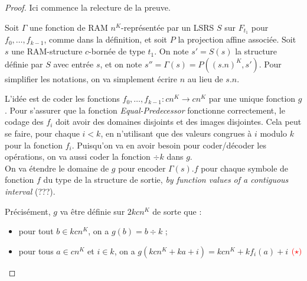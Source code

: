 \documentclass{report}
\begin{document}
		\begin{proof}
			Ici commence la relecture de la preuve.
			
			Soit $\Gamma$ une fonction de RAM $n^K$-représentée par un LSRS $S$ sur $F_{t_1}$ pour $f_0, \dots, f_{k-1}$, comme dans la définition, et soit $P$ la projection affine associée. Soit $s$ une RAM-structure $c$-bornée de type $t_1$. On note $s' = S(s)$ la structure définie par $S$ avec entrée $s$, et on note $s'' = \Gamma(s) = P\left( (s.n)^K, s'\right)$. Pour simplifier les notations, on va simplement écrire $n$ au lieu de $s.n$.
			
			L'idée est de coder les fonctions $f_0, \dots, f_{k-1} : cn^K \to cn^K$ par une unique fonction $g$. Pour s'assurer que la fonction \emph{Equal-Predecessor} fonctionne correctement, le codage des $f_i$ doit avoir des domaines disjoints et des images disjointes. Cela peut se faire, pour chaque $i<k$, en n'utilisant que des valeurs congrues à $i$ modulo $k$ pour la fonction $f_i$. Puisqu'on va en avoir besoin pour coder/décoder les opérations, on va aussi coder la fonction $\div k$ dans $g$.\\
			
			On va étendre le domaine de $g$ pour encoder $\Gamma(s).f$ pour chaque symbole de fonction $f$ du type de la structure de sortie, \emph{by function values of a contiguous interval} (???).
			
			Précisément, $g$ va être définie sur $2kcn^K$ de sorte que :
			
			\begin{itemize}[itemsep=-1mm]
				\item	pour tout $b \in kcn^K$, on a $g(b) = b \div k$ ;
				\item 	pour tous $a \in cn^K$ et $i \in k$, on a $g\left( kcn^K + ka + i \right) = kcn^K + k f_i(a) + i$ $\textcolor{red}{(\star)}$
			\end{itemize}
			
			\espace
			
\end{proof}
\end{document}

